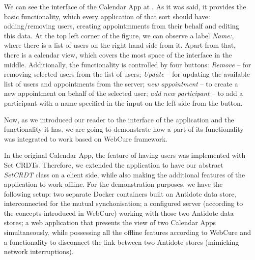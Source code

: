 We can see the interface of the Calendar App at . As it was said, it provides the basic functionality, which every application of that sort should have: adding/removing users, creating appointmments from their behalf and editing this data. At the top left corner of the figure, we can observe a label \textit{Name:}, where there is a list of users on the right hand side from it. Apart from that, there is a calendar view, which covers the most space of the interface in the middle. Additionally, the functionality is controlled by four buttons: \textit{Remove} -- for removing selected users from the list of users; \textit{Update} -- for updating the available list of users and appointments from the server; \textit{new appointment} -- to create a new appointment on behalf of the selected user; \textit{add new participant} -- to add a participant with a name specified in the input on the left side from the button. 

Now, as we introduced our reader to the interface of the application and the functionality it has, we are going to demonstrate how a part of its functionality was integrated to work based on WebCure framework. 

In the original Calendar App, the feature of having users was implemented with Set CRDTs. Therefore, we extended the application to have our abstract \textit{SetCRDT} class on a client side, while also making the additional features of the application to work offline. For the demonstration purposes, we have the following setup: two separate Docker containers built on Antidote data store, interconnected for the mutual synchonisation; a configured server (according to the concepts introduced in WebCure) working with those two Antidote data stores; a web application that presents the view of two Calendar Apps simultaneously, while possessing all the offline features according to WebCure and a functionality to disconnect the link between two Antidote stores (mimicking network interruptions). 

